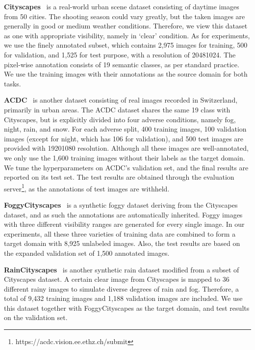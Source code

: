 \documentclass[letterpaper]{article} \usepackage{aaai23}  \usepackage{times}  \usepackage{helvet}  \usepackage{courier}  \usepackage[hyphens]{url}  \usepackage{graphicx} \urlstyle{rm} \def\UrlFont{\rm}  \usepackage{natbib}  \usepackage{caption} \frenchspacing  \setlength{\pdfpagewidth}{8.5in}  \setlength{\pdfpageheight}{11in}  \usepackage{algorithm}
\begin{document}
\noindent\textbf{Cityscapes}~\cite{cordts2016cityscapes} is a real-world urban scene dataset consisting of daytime images from 50 cities. The shooting season could vary greatly, but the taken images are generally in good or medium weather conditions. Therefore, we view this dataset as one with appropriate visibility, namely in `clear' condition. As for experiments, we use the finely annotated subset, which contains 2,975 images for training, 500 for validation, and 1,525 for test purpose, with a resolution of 20481024. The pixel-wise annotation consists of 19 semantic classes, as per standard practice. We use the training images with their annotations as the source domain for both tasks.

\noindent\textbf{ACDC}~\cite{sakaridis2021acdc} is another dataset consisting of real images recorded in Switzerland, primarily in urban areas. The ACDC dataset shares the same 19 class with Cityscapes, but is explicitly divided into four adverse conditions, namely fog, night, rain, and snow. For each adverse split, 400 training images, 100 validation images (except for night, which has 106 for validation), and 500 test images are provided with 19201080 resolution. Although all these images are well-annotated, we only use the 1,600 training images without their labels as the target domain. We tune the hyperparameters on ACDC's validation set, and the final results are reported on its test set. The test results are obtained through the evaluation server\footnote{https://acdc.vision.ee.ethz.ch/submit}, as the annotations of test images are withheld.

\noindent\textbf{FoggyCityscapes}~\cite{sakaridis2018semantic} is a synthetic foggy dataset deriving from the Cityscapes dataset, and as such the annotations are automatically inherited. Foggy images with three different visibility ranges are generated for every single image. In our experiments, all these three varieties of training data are combined to form a target domain with 8,925 unlabeled images. Also, the test results are based on the expanded validation set of 1,500 annotated images.

\noindent\textbf{RainCityscapes}~\cite{hu2019depth} is another synthetic rain dataset modified from a subset of Cityscapes dataset. A certain clear image from Cityscapes is mapped to 36 different rainy images to simulate diverse degrees of rain and fog. Therefore, a total of 9,432 training images and 1,188 validation images are included. We use this dataset together with FoggyCityscapes as the target domain, and test results on the validation set.
\end{document}
